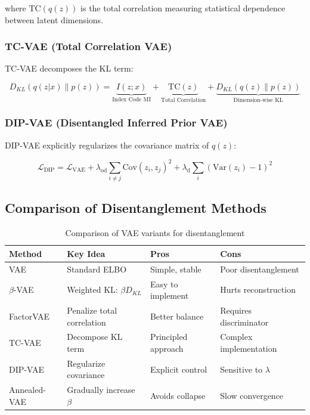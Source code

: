 \documentclass[conference]{IEEEtran}
\begin{document}
where $\text{TC}(q(z))$ is the total correlation measuring statistical dependence between latent dimensions.

\subsubsection{TC-VAE (Total Correlation VAE)}

TC-VAE decomposes the KL term:

\begin{equation}
D_{KL}(q(z|x) \| p(z)) = \underbrace{I(z; x)}_{\text{Index Code MI}} + \underbrace{\text{TC}(z)}_{\text{Total Correlation}} + \underbrace{D_{KL}(q(z) \| p(z))}_{\text{Dimension-wise KL}}
\end{equation}

\subsubsection{DIP-VAE (Disentangled Inferred Prior VAE)}

DIP-VAE explicitly regularizes the covariance matrix of $q(z)$:

\begin{equation}
\mathcal{L}_{\text{DIP}} = \mathcal{L}_{\text{VAE}} + \lambda_{\text{od}} \sum_{i \neq j} \text{Cov}(z_i, z_j)^2 + \lambda_{\text{d}} \sum_{i} (\text{Var}(z_i) - 1)^2
\end{equation}

\subsection{Comparison of Disentanglement Methods}

\begin{table}[H]
\centering
\small
\begin{tabular}{@{}p{2cm}p{3.5cm}p{3cm}p{3.5cm}@{}}
\toprule
\textbf{Method} & \textbf{Key Idea} & \textbf{Pros} & \textbf{Cons} \\ \midrule
VAE & Standard ELBO & Simple, stable & Poor disentanglement \\
$\beta$-VAE & Weighted KL: $\beta D_{KL}$ & Easy to implement & Hurts reconstruction \\
FactorVAE & Penalize total correlation & Better balance & Requires discriminator \\
TC-VAE & Decompose KL term & Principled approach & Complex implementation \\
DIP-VAE & Regularize covariance & Explicit control & Sensitive to $\lambda$ \\
Annealed-VAE & Gradually increase $\beta$ & Avoids collapse & Slow convergence \\ \bottomrule
\end{tabular}
\caption{Comparison of VAE variants for disentanglement}
\label{tab:vae_variants}
\end{table}
\end{document}

